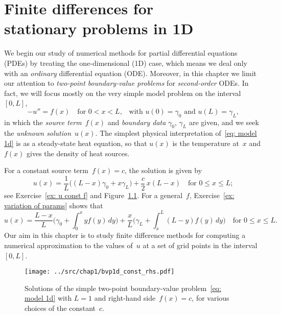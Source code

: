 \chapter[Finite differences in 1D]{Finite differences for \\ 
stationary problems in 1D}
\label{chap: finite diff 1d}
We begin our study of numerical methods for partial differential equations 
(PDEs) by treating the one-dimensional (1D) case, which means we deal only with 
an \emph{ordinary} differential equation (ODE).  Moreover, in this chapter we 
limit our attention to \emph{two-point boundary-value problems} for 
\emph{second-order} ODEs.  In fact, we will focus mostly on the very simple 
model problem on the interval~$[0,L]$,
\begin{equation}\label{eq: model 1d}
-u''=f(x)\quad\text{for $0<x<L$,}
	\quad\text{with $u(0)=\gamma_0$ and $u(L)=\gamma_L$,}
\end{equation}
in which the \emph{source term}~$f(x)$ and \emph{boundary data} $\gamma_0$, 
$\gamma_L$ are given, and we seek the \emph{unknown solution}~$u(x)$.  The 
simplest physical interpretation of~\eqref{eq: model 1d} is as a steady-state 
heat equation, so that $u(x)$ is the temperature at~$x$ and $f(x)$ gives the 
density of heat sources.

For a constant source term~$f(x)=c$, the solution is given by
\begin{equation}\label{eq: u const f}
u(x)=\frac{1}{L}\bigl((L-x)\gamma_0+x\gamma_L\bigr)+\frac{c}{2}\,x(L-x)
	\quad\text{for $0\le x\le L$;}
\end{equation}
see Exercise~\ref{ex: u const f} and Figure~\ref{fig: bvp 1d f const}. For a 
general~$f$, Exercise~\ref{ex: variation of params} shows that
\begin{equation}\label{eq: model 1d exact soln}
u(x)=\frac{L-x}{L}\biggl(\gamma_0+\int_0^x yf(y)\,dy\biggr)
	+\frac{x}{L}\biggl(\gamma_L+\int_x^L(L-y)f(y)\,dy\biggr)
	\quad\text{for $0\le x\le L$.}
\end{equation}
Our aim in this chapter is to study finite difference methods for computing 
a numerical approximation to the values of~$u$ at a set of grid points in the 
interval~$[0,L]$.

\begin{figure}
\caption{Solutions of the simple two-point boundary-value 
problem~\eqref{eq: model 1d} with $L=1$ and right-hand side~$f(x)=c$, for 
various choices of the constant~$c$.}\label{fig: bvp 1d f const}
\begin{center}
\texttt{[image: ../src/chap1/bvp1d\_const\_rhs.pdf]}
\end{center}
\end{figure}

